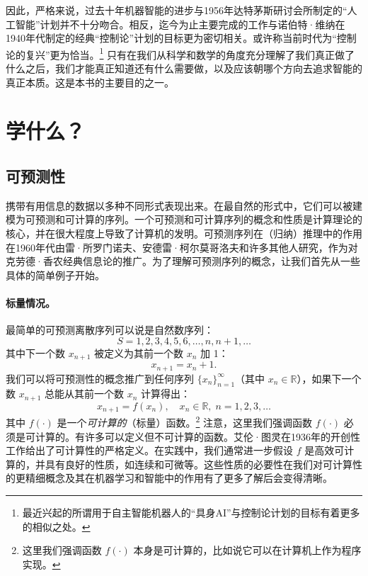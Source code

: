 \documentclass[../../book-main_zh.tex]{subfiles}
\begin{document}
因此，严格来说，过去十年机器智能的进步与1956年达特茅斯研讨会所制定的“人工智能”计划并不十分吻合。相反，迄今为止主要完成的工作与诺伯特·维纳在1940年代制定的经典“控制论”计划的目标更为密切相关。或许称当前时代为“控制论的复兴”更为恰当。\footnote{最近兴起的所谓用于自主智能机器人的“具身AI”与控制论计划的目标有着更多的相似之处。} 只有在我们从科学和数学的角度充分理解了我们真正做了什么之后，我们才能真正知道还有什么需要做，以及应该朝哪个方向去追求智能的真正本质。这是本书的主要目的之一。


\section{学什么？}
\label{sec:what-to-learn}



\subsection{可预测性}
\label{sec:predictability}
携带有用信息的数据以多种不同形式表现出来。在最自然的形式中，它们可以被建模为可预测和可计算的序列。一个可预测和可计算序列的概念和性质是计算理论的核心，并在很大程度上导致了计算机的发明\cite{Turing-1936}。可预测序列在（归纳）推理中的作用在1960年代由雷·所罗门诺夫、安德雷·柯尔莫哥洛夫和许多其他人研究\cite{Kolmogorov1998OnTO}，作为对克劳德·香农经典信息论\cite{Shannon-1948}的推广。为了理解可预测序列的概念，让我们首先从一些具体的简单例子开始。
\paragraph{标量情况。} 最简单的可预测离散序列可以说是自然数序列：
\begin{equation}
   {S} =  1, 2, 3, 4, 5, 6, \ldots, n, n+1, \ldots
\end{equation}
其中下一个数 $x_{n+1}$ 被定义为其前一个数 $x_n$ 加 1：
\begin{equation}
x_{n+1} = x_n + 1.    
\end{equation}
我们可以将可预测性的概念推广到任何序列 $\{x_n\}_{n=1}^\infty$（其中 $x_n \in \mathbb{R}$），如果下一个数 $x_{n+1}$ 总能从其前一个数 $x_n$ 计算得出：
\begin{equation}
    x_{n+1} = f(x_{n}), \quad x_n \in \mathbb{R}, \; n =  1, 2, 3, \ldots
\end{equation}
其中 $f(\cdot)$ 是一个{\em 可计算的}（标量）函数。\footnote{这里我们强调函数 $f(\cdot)$ 本身是可计算的，比如说它可以在计算机上作为程序实现。} 注意，这里我们强调函数 $f(\cdot)$ 必须是可计算的。有许多可以定义但不可计算的函数。艾伦·图灵在1936年的开创性工作\cite{Turing-1936}给出了可计算性的严格定义。在实践中，我们通常进一步假设 $f$ 是高效可计算的，并具有良好的性质，如连续和可微等。这些性质的必要性在我们对可计算性的更精细概念及其在机器学习和智能中的作用有了更多了解后会变得清晰。
\end{document}
